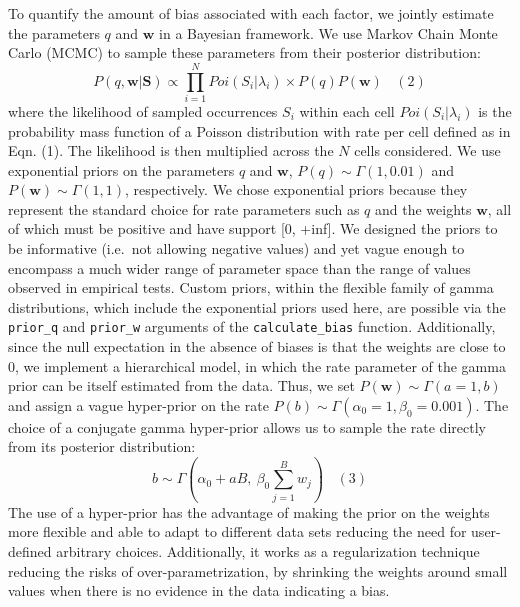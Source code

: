 \documentclass[
  12pt,
]{article}
\begin{document}
To quantify the amount of bias associated with each factor, we jointly estimate the parameters \(q\) and \(\mathbf{w}\) in a Bayesian framework. We use Markov Chain Monte Carlo (MCMC) to sample these parameters from their posterior distribution:
\[
P(q, \mathbf{w} | \mathbf{S}) \propto \prod_{i=1}^{N}{ Poi(S_i | \lambda_i) } \times P(q) P(\mathbf{w}) \ \ \ \ (2)
\]
where the likelihood of sampled occurrences \(S_i\) within each cell \(Poi(S_i | \lambda_i)\) is the probability mass function of a Poisson distribution with rate per cell defined as in Eqn. (1). The likelihood is then multiplied across the \(N\) cells considered. We use exponential priors on the parameters \(q\) and \(\mathbf{w}\), \(P(q) \sim \Gamma(1, 0.01)\) and \(P(\mathbf{w}) \sim \Gamma(1, 1)\), respectively. We chose exponential priors because they represent the standard choice for rate parameters such as \(q\) and the weights \(\mathbf{w}\), all of which must be positive and have support {[}0, +inf{]}. We designed the priors to be informative (i.e.~not allowing negative values) and yet vague enough to encompass a much wider range of parameter space than the range of values observed in empirical tests. Custom priors, within the flexible family of gamma distributions, which include the exponential priors used here, are possible via the \texttt{prior\_q} and \texttt{prior\_w} arguments of the \texttt{calculate\_bias} function. Additionally, since the null expectation in the absence of biases is that the weights are close to 0, we implement a hierarchical model, in which the rate parameter of the gamma prior can be itself estimated from the data. Thus, we set \(P(\mathbf{w}) \sim \Gamma(a=1, b)\) and assign a vague hyper-prior on the rate \(P(b) \sim \Gamma(\alpha_0=1, \beta_0=0.001)\). The choice of a conjugate gamma hyper-prior allows us to sample the rate directly from its posterior distribution:
\[
b \sim \Gamma \left(\alpha_0 + a B,\ \beta_0  \sum_{j=1}^{B}{w_j} \right) \ \ \ \ (3)
\]
The use of a hyper-prior has the advantage of making the prior on the weights more flexible and able to adapt to different data sets reducing the need for user-defined arbitrary choices. Additionally, it works as a regularization technique reducing the risks of over-parametrization, by shrinking the weights around small values when there is no evidence in the data indicating a bias.
\end{document}
